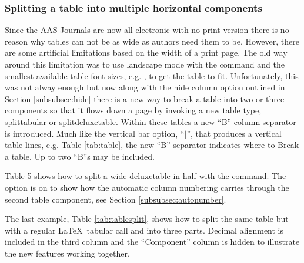 \documentclass{aastex6}
\newcommand\latex{La\TeX}
\begin{document}
\subsubsection{Splitting a table into multiple horizontal components}

Since the AAS Journals are now all electronic with no print version there is
no reason why tables can not be as wide as authors need them to be.
However, there are some artificial limitations based on the width of a
print page.  The old way around this limitation was to use landscape mode
with the {\tt\string\rotate} command and the smallest available table font
sizes, e.g. {\tt\string\tablewidth}, to get the table to fit.
Unfortunately, this was not alway enough but now along with the hide column
option outlined in Section \ref{subsubsec:hide} there is a new way to break
a table into two or three components so that it flows down a page by
invoking a new table type, splittabular or splitdeluxetable. Within these
tables a new ``B'' column separator is introduced.  Much like the vertical
bar option, ``$\vert$'', that produces a vertical table lines, e.g. Table
\ref{tab:table}, the new ``B'' separator indicates where to \underline{B}reak
a table.  Up to two ``B''s may be included.

Table 5 %
shows how to split a wide deluxetable in half with
the {\tt\string\splitdeluxetable} command.  The {\tt\string\colnumbers}
option is on to show how the automatic column numbering carries through the
second table component, see Section \ref{subsubsec:autonumber}.

The last example, Table \ref{tab:tablesplit}, shows how to split the same
table but with a regular \latex\ tabular call and into three parts. Decimal
alignment is included in the third column and the ``Component'' column is
hidden to illustrate the new features working together.
\end{document}
